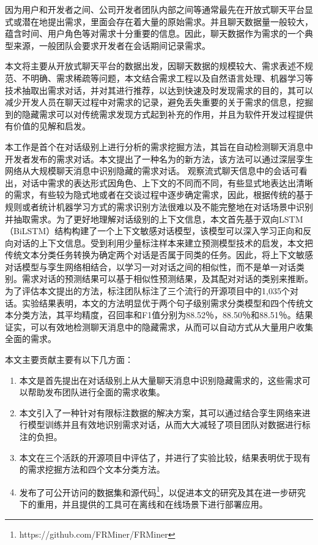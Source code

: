 因为用户和开发者之间、公司开发者团队内部之间等通常最先在开放式聊天平台显式或潜在地提出需求，里面会存在着大量的原始需求。并且聊天数据量一般较大，蕴含时间、用户角色等对需求十分重要的信息。因此，聊天数据作为需求的一个典型来源，一般团队会要求开发者在会话期间记录需求。


本文将主要从开放式聊天平台的数据出发，因聊天数据的规模较大、需求表述不规范、不明确、需求稀疏等问题，本文结合需求工程以及自然语言处理、机器学习等技术抽取出需求对话，并对其进行推荐，以达到快速及时发现需求的目的，其可以减少开发人员在聊天过程中对需求的记录，避免丢失重要的关于需求的信息，挖掘到的隐藏需求可以对传统需求发现方式起到补充的作用，并且为软件开发过程提供有价值的见解和启发。

本工作是首个在对话级别上进行分析的需求挖掘方法，其旨在自动检测聊天消息中开发者发布的需求对话。本文提出了一种名为{\tool}的新方法，该方法可以通过深层孪生网络从大规模聊天消息中识别隐藏的需求对话。
观察流式聊天信息中的会话可看出，对话中需求的表达形式因角色、上下文的不同而不同，有些显式地表达出清晰的需求，有些较为隐式地或者在交谈过程中逐步确定需求，因此，根据传统的基于规则或者统计机器学习方式的需求识别方法很难以及不能完整地在对话场景中识别并抽取需求。为了更好地理解对话级别的上下文信息，本文首先基于双向LSTM（BiLSTM）结构构建了一个上下文敏感对话模型{\dm}，该模型可以深入学习正向和反向对话的上下文信息。受到利用少量标注样本来建立预测模型技术的启发，本文把传统文本分类任务转换为确定两个对话是否属于同类的任务。因此，{\tool}将上下文敏感对话模型与孪生网络相结合，以学习一对对话之间的相似性，而不是单一对话类别。需求对话的预测结果可以基于相似性预测结果，及其配对对话的类别来推断。为了评估本文提出的方法，标注团队标注了三个流行的开源项目中的1,035个对话。实验结果表明，本文的方法明显优于两个句子级别需求分类模型和四个传统文本分类方法，其平均精度，召回率和F1值分别为88.52％，88.50％和88.51％。结果证实，{\tool}可以有效地检测聊天消息中的隐藏需求，从而可以自动方式从大量用户收集全面的需求。

本文主要贡献主要有以下几方面：
\begin{enumerate}
    \item  本文是首先提出在对话级别上从大量聊天消息中识别隐藏需求的，这些需求可以帮助发布团队进行全面的需求收集。
    \item 本文引入了一种针对有限标注数据的解决方案，其可以通过结合孪生网络来进行模型训练并且有效地识别需求对话，从而大大减轻了项目团队对数据进行标注的负担。
    \item 本文在三个活跃的开源项目中评估了{\tool}，并进行了实验比较，结果表明{\tool}优于现有的需求挖掘方法和四个文本分类方法。
    \item 发布了可公开访问的数据集和源代码\footnote{https://github.com/FRMiner/FRMiner}，以促进本文的研究及其在进一步研究下的重用，并且提供的{\tool}工具可在离线和在线场景下进行部署应用。
\end{enumerate}



